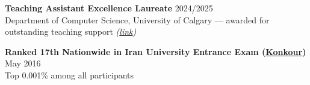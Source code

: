 \documentclass[a4paper,10pt]{article}
\begin{document}
\textbf{Teaching Assistant Excellence Laureate} \hfill 2024/2025 \\
Department of Computer Science, University of Calgary --- awarded for outstanding teaching support \textit{(\href{https://science.ucalgary.ca/computer-science/about/our-department/ta-recognition-2024-2025}{link})}

\vspace{0.35em}

\textbf{Ranked 17th Nationwide in Iran University Entrance Exam (\href{https://en.wikipedia.org/wiki/Iranian_University_Entrance_Exam}{Konkour})} \hfill May 2016 \\
Top 0.001\% among all participants
\end{document}
